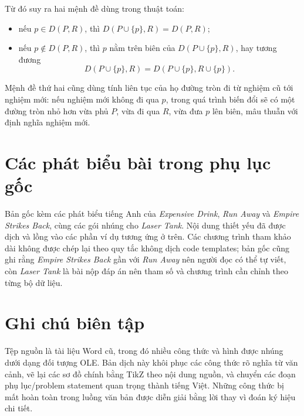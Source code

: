 \documentclass[11pt]{article}
\begin{document}
Từ đó suy ra hai mệnh đề dùng trong thuật toán:
\begin{itemize}
  \item nếu \(p\in D(P,R)\), thì \(D(P\cup\{p\},R)=D(P,R)\);
  \item nếu \(p\notin D(P,R)\), thì \(p\) nằm trên biên của
  \(D(P\cup\{p\},R)\), hay tương đương
  \[
    D(P\cup\{p\},R)=D(P\cup\{p\},R\cup\{p\}).
  \]
\end{itemize}
Mệnh đề thứ hai cũng dùng tính liên tục của họ đường tròn đi từ nghiệm cũ tới
nghiệm mới: nếu nghiệm mới không đi qua \(p\), trong quá trình biến đổi sẽ có
một đường tròn nhỏ hơn vừa phủ \(P\), vừa đi qua \(R\), vừa đưa \(p\) lên biên,
mâu thuẫn với định nghĩa nghiệm mới.

\section{Các phát biểu bài trong phụ lục gốc}

Bản gốc kèm các phát biểu tiếng Anh của \textit{Expensive Drink},
\textit{Run Away} và \textit{Empire Strikes Back}, cùng các gói nhúng cho
\textit{Laser Tank}. Nội dung thiết yếu đã được dịch và lồng vào các phần ví
dụ tương ứng ở trên. Các chương trình tham khảo dài không được chép lại theo
quy tắc không dịch code templates; bản gốc cũng ghi rằng \textit{Empire
Strikes Back} gần với \textit{Run Away} nên người đọc có thể tự viết, còn
\textit{Laser Tank} là bài nộp đáp án nên tham số và chương trình cần chỉnh
theo từng bộ dữ liệu.

\section*{Ghi chú biên tập}

Tệp nguồn là tài liệu Word cũ, trong đó nhiều công thức và hình được nhúng dưới
dạng đối tượng OLE. Bản dịch này khôi phục các công thức rõ nghĩa từ văn cảnh,
vẽ lại các sơ đồ chính bằng TikZ theo nội dung nguồn, và chuyển các đoạn phụ
lục/problem statement quan trọng thành tiếng Việt. Những công thức bị mất hoàn
toàn trong luồng văn bản được diễn giải bằng lời thay vì đoán ký hiệu chi tiết.
\end{document}
